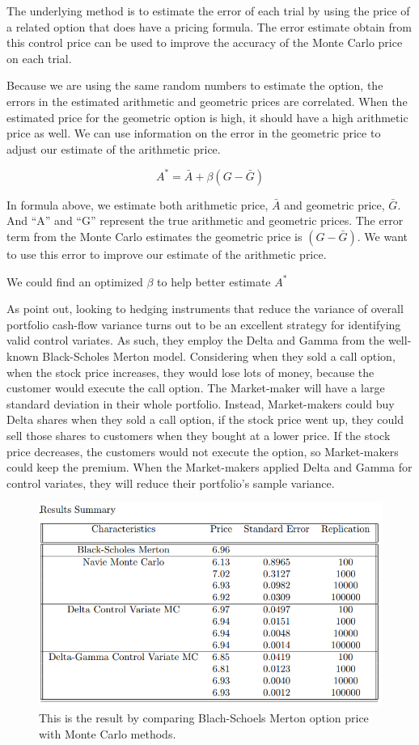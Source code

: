 \documentclass[11pt,]{article}
\makeatletter
\def\maxwidth{\ifdim\Gin@nat@width>\linewidth\linewidth
\else\Gin@nat@width\fi}
\let\Oldincludegraphics\includegraphics
\renewcommand{\includegraphics}[1]{\Oldincludegraphics[width=\maxwidth]{#1}}
\makeatother
\begin{document}
The underlying method is to estimate the error of each trial by using
the price of a related option that does have a pricing formula. The
error estimate obtain from this control price can be used to improve the
accuracy of the Monte Carlo price on each trial.

Because we are using the same random numbers to estimate the option, the
errors in the estimated arithmetic and geometric prices are correlated.
When the estimated price for the geometric option is high, it should
have a high arithmetic price as well. We can use information on the
error in the geometric price to adjust our estimate of the arithmetic
price.

\[
A^* = \bar A + \beta(G-\bar G)
\]

In formula above, we estimate both arithmetic price, \(\bar A\) and
geometric price, \(\bar G\). And ``A'' and ``G'' represent the true
arithmetic and geometric prices. The error term from the Monte Carlo
estimates the geometric price is \((G - \bar G)\). We want to use this
error to improve our estimate of the arithmetic price.

We could find an optimized \(\beta\) to help better estimate \(A^*\)

As \citet{ClewlowStrickland} point out, looking to hedging instruments
that reduce the variance of overall portfolio cash-flow variance turns
out to be an excellent strategy for identifying valid control variates.
As such, they employ the Delta and Gamma from the well-known
Black-Scholes Merton model. Considering when they sold a call option,
when the stock price increases, they would lose lots of money, because
the customer would execute the call option. The Market-maker will have a
large standard deviation in their whole portfolio. Instead,
Market-makers could buy Delta shares when they sold a call option, if
the stock price went up, they could sell those shares to customers when
they bought at a lower price. If the stock price decreases, the
customers would not execute the option, so Market-makers could keep the
premium. When the Market-makers applied Delta and Gamma for control
variates, they will reduce their portfolio's sample variance.

\begin{figure}
\centering
\includegraphics{images/Result.PNG}
\caption{This is the result by comparing Blach-Schoels Merton option
price with Monte Carlo methods.}
\end{figure}
\end{document}
